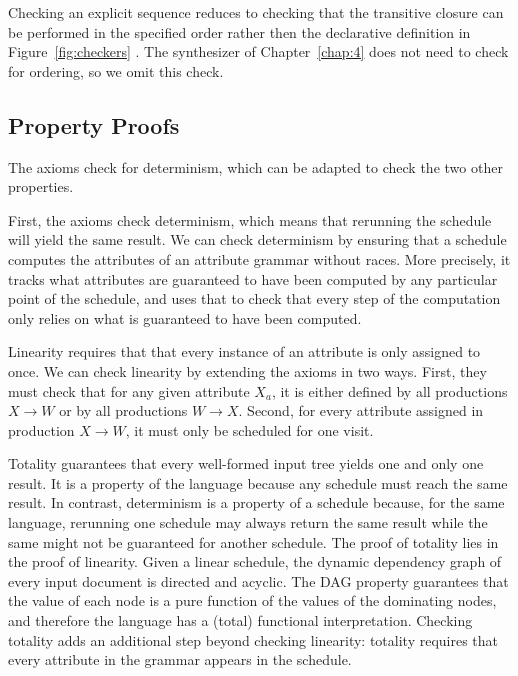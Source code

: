 
Checking an explicit sequence reduces to checking that the transitive closure can be performed in the specified order rather then the declarative definition in Figure~\ref{fig:checkers} . The synthesizer of Chapter~\ref{chap:4} does not need to check for ordering, so we omit this check.


\subsection{Property Proofs}
The axioms check for determinism, which can be adapted to check the two other properties.

First, the axioms check determinism, which means that rerunning the schedule will yield the same result.  We can check determinism by ensuring that a schedule computes the attributes of an attribute grammar without races. More precisely, it tracks what attributes are guaranteed to have been computed by any particular point of the schedule, and uses that to check that every step of the computation only relies on what is guaranteed to have been computed.

Linearity requires that that every instance of an attribute is only assigned to once. We can check linearity by extending the axioms in two ways. First, they must check that for any given attribute $X_a$, it is either defined by all productions $X \rightarrow W$ or by all productions $W \rightarrow X$. Second, for every attribute assigned in production $X \rightarrow W$, it must only be scheduled for one visit. 

Totality guarantees that every well-formed input tree yields one and only one result. It is a property of the language because any schedule must reach the same result. In contrast, determinism is a property of a schedule because, for the same language, rerunning one schedule may always return the same result while the same might not be guaranteed for another schedule. The proof of totality lies in the proof of linearity. Given a linear schedule, the dynamic dependency graph of every input document is directed and acyclic. The DAG property guarantees that the value of each node is a pure function of the values of the dominating nodes, and therefore the language has a (total) functional interpretation. Checking totality adds an additional step beyond checking linearity: totality requires that every attribute in the grammar appears in the schedule.

